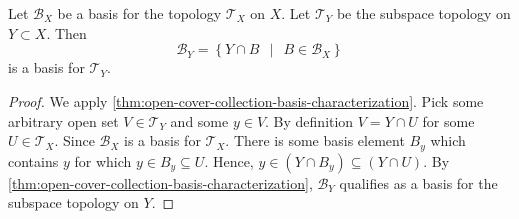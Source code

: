 \begin{lemma}
    Let \( \mathscr{B}_{X} \) be a basis for the topology \( \mathscr{T}_{X} \) on \( X \). Let \( \mathscr{T}_{Y} \) be the subspace topology on \( Y \subset X \). Then 
    \[ \mathscr{B}_{Y} = \left\{ Y \cap B \ \ \middle| \ \ B \in \mathscr{B}_{X} \right\} \]
    is a basis for \( \mathscr{T}_{Y} \).
\end{lemma}
\begin{proof}
    We apply \cref{thm:open-cover-collection-basis-characterization}. Pick some arbitrary open set \( V \in \mathscr{T}_{Y} \) and some \( y \in V \). By definition \( V = Y \cap U \) for some \( U \in \mathscr{T}_{X} \). Since \( \mathscr{B}_{X} \) is a basis for \( \mathscr{T}_{X} \). There is some basis element \( B_{y} \) which contains \( y \) for which \( y \in B_{y} \subseteq U \). Hence, \( y \in  \left( Y \cap B_{y}\right) \subseteq \left( Y \cap U \right) \). By \cref{thm:open-cover-collection-basis-characterization}, \( \mathscr{B}_{Y} \) qualifies as a basis for the subspace topology on \( Y \).
\end{proof}

